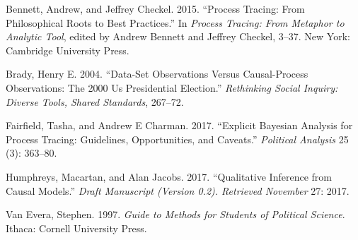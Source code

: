 \documentclass[
]{article}
\begin{document}
\hypertarget{refs}{}
\leavevmode\hypertarget{ref-BennettCheckel2015PT}{}%
Bennett, Andrew, and Jeffrey Checkel. 2015. ``Process Tracing: From
Philosophical Roots to Best Practices.'' In \emph{Process Tracing: From
Metaphor to Analytic Tool}, edited by Andrew Bennett and Jeffrey
Checkel, 3--37. New York: Cambridge University Press.

\leavevmode\hypertarget{ref-brady2004data}{}%
Brady, Henry E. 2004. ``Data-Set Observations Versus Causal-Process
Observations: The 2000 Us Presidential Election.'' \emph{Rethinking
Social Inquiry: Diverse Tools, Shared Standards}, 267--72.

\leavevmode\hypertarget{ref-fairfield2017explicit}{}%
Fairfield, Tasha, and Andrew E Charman. 2017. ``Explicit Bayesian
Analysis for Process Tracing: Guidelines, Opportunities, and Caveats.''
\emph{Political Analysis} 25 (3): 363--80.

\leavevmode\hypertarget{ref-humphreys2017qualitative}{}%
Humphreys, Macartan, and Alan Jacobs. 2017. ``Qualitative Inference from
Causal Models.'' \emph{Draft Manuscript (Version 0.2). Retrieved
November} 27: 2017.

\leavevmode\hypertarget{ref-VanEvera1997}{}%
Van Evera, Stephen. 1997. \emph{Guide to Methods for Students of
Political Science}. Ithaca: Cornell University Press.
\end{document}
